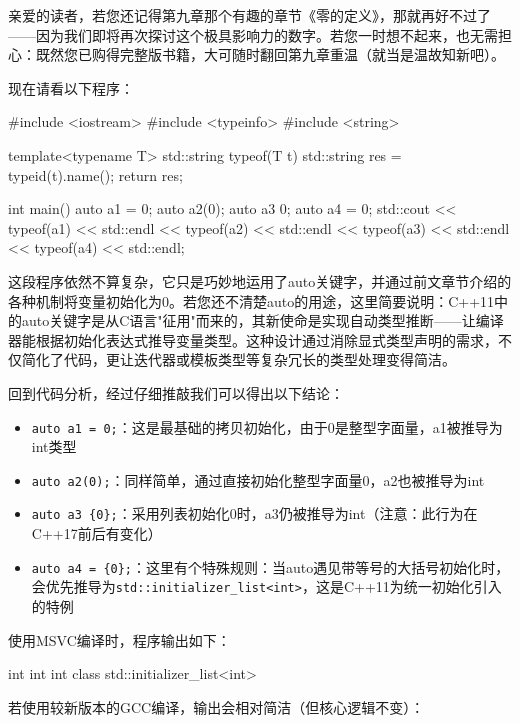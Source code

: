 
亲爱的读者，若您还记得第九章那个有趣的章节《零的定义》，那就再好不过了——因为我们即将再次探讨这个极具影响力的数字。若您一时想不起来，也无需担心：既然您已购得完整版书籍，大可随时翻回第九章重温（就当是温故知新吧）。

现在请看以下程序：

\begin{cpp}
#include <iostream>
#include <typeinfo>
#include <string>

template<typename T> std::string typeof(T t) {
  std::string res = typeid(t).name();
  return res;
}

int main() {
  auto a1 = 0;
  auto a2(0);
  auto a3 {0};
  auto a4 = {0};
  std::cout << typeof(a1) << std::endl
            << typeof(a2) << std::endl
            << typeof(a3) << std::endl
            << typeof(a4) << std::endl;
}
\end{cpp}

这段程序依然不算复杂，它只是巧妙地运用了auto关键字，并通过前文章节介绍的各种机制将变量初始化为0。若您还不清楚auto的用途，这里简要说明：C++11中的auto关键字是从C语言"征用"而来的，其新使命是实现自动类型推断——让编译器能根据初始化表达式推导变量类型。这种设计通过消除显式类型声明的需求，不仅简化了代码，更让迭代器或模板类型等复杂冗长的类型处理变得简洁。

回到代码分析，经过仔细推敲我们可以得出以下结论：

\begin{itemize}
\item 
\verb|auto a1 = 0;|：这是最基础的拷贝初始化，由于0是整型字面量，a1被推导为int类型

\item 
\verb|auto a2(0);|：同样简单，通过直接初始化整型字面量0，a2也被推导为int

\item 
\verb|auto a3 {0};|：采用列表初始化{0}时，a3仍被推导为int（注意：此行为在C++17前后有变化）

\item 
\verb|auto a4 = {0};|：这里有个特殊规则：当auto遇见带等号的大括号初始化时，会优先推导为\verb|std::initializer_list<int>|，这是C++11为统一初始化引入的特例
\end{itemize}

使用MSVC编译时，程序输出如下：

\begin{shell}
int
int
int
class std::initializer_list<int>
\end{shell}

若使用较新版本的GCC编译，输出会相对简洁（但核心逻辑不变）：

